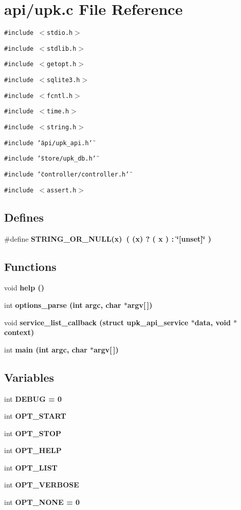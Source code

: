 \section{api/upk.c File Reference}
\label{api_2upk_8c}
{\tt \#include $<$stdio.h$>$}\par
{\tt \#include $<$stdlib.h$>$}\par
{\tt \#include $<$getopt.h$>$}\par
{\tt \#include $<$sqlite3.h$>$}\par
{\tt \#include $<$fcntl.h$>$}\par
{\tt \#include $<$time.h$>$}\par
{\tt \#include $<$string.h$>$}\par
{\tt \#include \char`\"{}api/upk\_\-api.h\char`\"{}}\par
{\tt \#include \char`\"{}store/upk\_\-db.h\char`\"{}}\par
{\tt \#include \char`\"{}controller/controller.h\char`\"{}}\par
{\tt \#include $<$assert.h$>$}\par
\subsection*{Defines}
\begin{CompactItemize}
\item 
\#define \bf{STRING\_\-OR\_\-NULL}(x)~( (x) ? ( x ) : \char`\"{}[unset]\char`\"{} )
\end{CompactItemize}
\subsection*{Functions}
\begin{CompactItemize}
\item 
void \bf{help} ()
\item 
int \bf{options\_\-parse} (int argc, char $\ast$argv[$\,$])
\item 
void \bf{service\_\-list\_\-callback} (struct \bf{upk\_\-api\_\-service} $\ast$data, void $\ast$context)
\item 
int \bf{main} (int argc, char $\ast$argv[$\,$])
\end{CompactItemize}
\subsection*{Variables}
\begin{CompactItemize}
\item 
int \bf{DEBUG} = 0
\item 
int \bf{OPT\_\-START}
\item 
int \bf{OPT\_\-STOP}
\item 
int \bf{OPT\_\-HELP}
\item 
int \bf{OPT\_\-LIST}
\item 
int \bf{OPT\_\-VERBOSE}
\item 
int \bf{OPT\_\-NONE} = 0
\end{CompactItemize}


